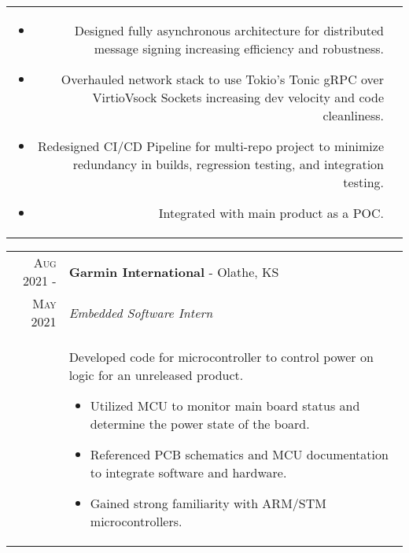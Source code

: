 \documentclass[a4paper,12pt]{article}
\begin{document}
\begin{tabularx}{\textwidth}{r|X}
\begin{itemize}[leftmargin=20pt,topsep=1pt,itemsep=1pt,partopsep=0pt, parsep=1pt]
            \begin{itemize}[leftmargin=20pt,topsep=1pt,itemsep=1pt,partopsep=0pt, parsep=1pt]
              \item Designed fully asynchronous architecture for distributed message signing increasing efficiency and robustness.
              \item Overhauled network stack to use Tokio's Tonic gRPC over VirtioVsock Sockets increasing dev velocity and code cleanliness.
              \item Redesigned CI/CD Pipeline for multi-repo project to minimize redundancy in builds, regression testing, and integration testing.
              \item Integrated with main product as a POC.
            \end{itemize}
      \vspace{-0.5cm}
      \end{itemize}\\
\end{tabularx}

%
%
\begin{tabularx}{\textwidth}{r|X}
   \textsc{Aug 2021 \--} & \textbf{Garmin International} \-- Olathe, KS\\
   \textsc{May 2021} & \emph{Embedded Software Intern}\\
   & \small{Developed code for microcontroller to control power on logic for an unreleased product.
      \begin{itemize}[leftmargin=20pt,topsep=1pt,itemsep=1pt,partopsep=0pt, parsep=1pt]
        \item Utilized MCU to monitor main board status and determine the power state of the board.
        \item Referenced PCB schematics and MCU documentation to integrate software and hardware.
        \item Gained strong familiarity with ARM/STM microcontrollers.
      \vspace{-0.5cm}
      \end{itemize}}\\
\end{tabularx}
\end{document}
